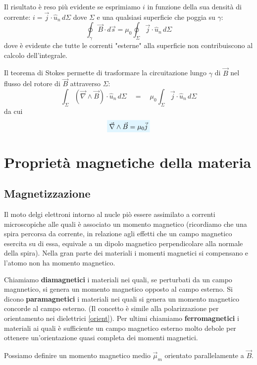 \documentclass[x11names]{report}
\newcommand{\viola}[1]{%
	\colorbox{myblue}{$\displaystyle #1$}
}
\begin{document}
Il risultato è reso più evidente se esprimiamo \(i\) in funzione della sua densità di corrente: \(i = \vec{j}\cdot \hat{u}_n \, d\Sigma\) dove \(\Sigma\) e una qualsiasi superficie che poggia su \(\gamma\):
\[
\oint _\gamma \vec{B}\cdot d\vec{s} = \mu_0 \oint_\Sigma \vec{j}\cdot \hat{u}_n \, d\Sigma
\]
dove è evidente che tutte le correnti "esterne" alla superficie non contribuiscono al calcolo dell'integrale.

Il teorema di Stokes permette di trasformare la circuitazione lungo \(\gamma\) di \(\vec{B}\) nel flusso del rotore di \(\vec{B}\) attraverso \(\Sigma\):
\[
\int_\Sigma (\vec{\nabla}\wedge\vec{B})\cdot \hat{u}_n \, d\Sigma \quad = \quad \mu_0 \int_\Sigma \vec{j}\cdot \hat{u}_n \, d\Sigma
\]
da cui
\begin{equation}
	\viola{\vec{\nabla}\wedge\vec{B} = \mu_0 \vec{j}}
\end{equation}


\section{Proprietà magnetiche della materia}

\subsection{Magnetizzazione}
Il moto delgi elettroni intorno al nucle piò essere assimilato a correnti microscopiche alle quali è associato un momento magnetico (ricordiamo che una spira percorsa da corrente, in relazione agli effetti che un campo magnetico esercita su di essa, equivale a un dipolo magnetico perpendicolare alla normale della spira). Nella gran parte dei materiali i momenti magnetici si compensano e l'atomo non ha momento magnetico.

Chiamiamo \textbf{diamagnetici} i materiali nei quali, se perturbati da un campo magnnetico, si genera un momento magnetico opposto al campo esterno. Si dicono  \textbf{paramagnetici} i materiali nei quali si genera un momento magnetico concorde al campo esterno. (Il concetto è simile alla polarizzazione per orientamento nei dielettrici \ref{orient}). Per ultimi chiamiamo \textbf{ferromagnetici}  i materiali ai quali è sufficiente un campo magnetico esterno molto debole per ottenere un'orientazione quasi completa dei momenti magnetici.

Possiamo definire un momento magnetico medio \(\vec{\mu}_m\) orientato parallelamente a \(\vec{B}\).
\end{document}
